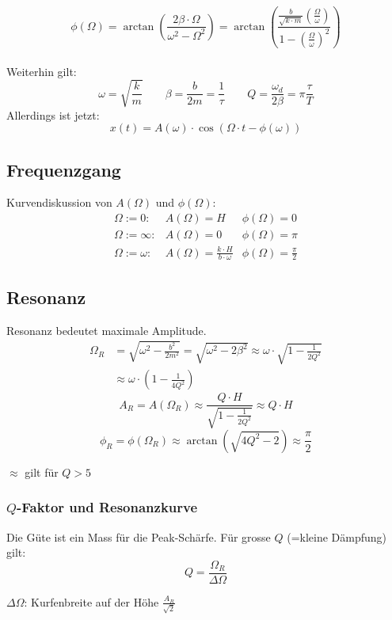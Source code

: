 \[\boxed{
	\phi(\Omega) = \arctan \left( \frac{2\beta \cdot \Omega}{\omega^2 - \Omega^2} \right)
		= \arctan \left( \frac{\frac{b}{\sqrt{k \cdot m}} \left( \frac{\Omega}{\omega} \right)}{1 - \left(\frac{\Omega}{\omega}\right)^2 } \right)
}\]
\\
Weiterhin gilt:
\[
	\omega = \sqrt{\frac{k}{m}} \qquad
	\beta = \frac{b}{2m} = \frac{1}{\tau} \qquad
	Q = \frac{\omega_d}{2\beta} = \pi \frac{\tau}{T}
\]
Allerdings ist jetzt:
\[\boxed{
	x(t) = A(\omega) \cdot \cos(\Omega \cdot t - \phi(\omega))
}\]



\subsection{Frequenzgang}
Kurvendiskussion von $A(\Omega)$ und $\phi(\Omega)$:
\[\begin{matrix}
	\Omega := 0: & A(\Omega) = H & \phi(\Omega) = 0 \\ 
	\Omega := \infty: & A(\Omega) = 0 & \phi(\Omega) = \pi \\ 
	\Omega := \omega: & A(\Omega) = \frac{k \cdot H}{b \cdot \omega} & \phi(\Omega) = \frac{\pi}{2}
\end{matrix} \]


\subsection{Resonanz}
Resonanz bedeutet maximale Amplitude.
\[\boxed{\begin{aligned}
	\Omega_R &= \sqrt{\omega^2 - \frac{b^2}{2m^2}}
	         = \sqrt{\omega^2 - 2\beta^2}
	         \approx \omega \cdot \sqrt{1 - \frac{1}{2Q^2}}\\
	         &\approx \omega \cdot \left( 1 - \frac{1}{4Q^2} \right)
\end{aligned}}\]
\[\boxed{
	A_R = A(\Omega_R) \approx \frac{Q \cdot H}{\sqrt{1 - \frac{1}{2Q^2}}} \approx Q \cdot H
}\]
\[\boxed{
	\phi_R = \phi(\Omega_R) \approx \arctan \left( \sqrt{4Q^2 - 2} \right) \approx \frac{\pi}{2}
}\]
\begin{footnotesize}
	$\approx$ gilt für $Q>5$
\end{footnotesize}

\subsubsection{$Q$-Faktor und Resonanzkurve}
Die Güte ist ein Mass für die Peak-Schärfe. Für grosse $Q$ (=kleine Dämpfung) gilt:
\[\boxed{
	Q = \frac{\Omega_R}{\Delta \Omega}
}\]
\begin{footnotesize}
	$\Delta \Omega$: Kurfenbreite auf der Höhe $\frac{A_R}{\sqrt2}$
\end{footnotesize}